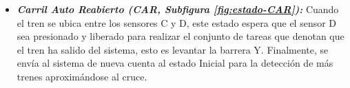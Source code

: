 \documentclass[journal]{IEEEtran}
\begin{document}
\begin{itemize}
	\item \emph{\textbf{Carril Auto Reabierto (CAR, Subfigura \ref{fig:estado-CAR}):}} Cuando el tren se ubica entre los sensores C y D, este estado espera que el sensor D sea presionado y liberado para realizar el conjunto de tareas que denotan que el tren ha salido del sistema, esto es levantar la barrera Y.
	Finalmente, se envía al sistema de nueva cuenta al estado Inicial para la detección de más trenes aproximándose al cruce.
\end{itemize}

\begin{figure}[!t]
\centering

{}
\end{figure}
\end{document}

